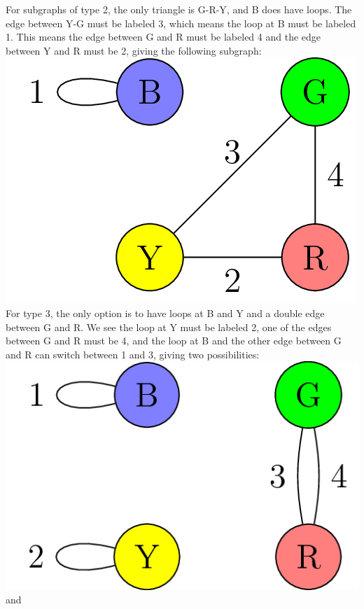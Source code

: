 \documentclass[10pt,]{book}
\theoremstyle{plain}
\theoremstyle{definition}
\theoremstyle{definition}
\theoremstyle{definition}
\begin{document}
%
\par
\hypertarget{p-66}{}%
For subgraphs of type 2, the only triangle is G-R-Y, and B does have loops. The edge between Y-G must be labeled 3, which means the loop at B must be labeled 1. This means the edge between G and R must be labeled 4 and the edge between Y and R must be 2, giving the following subgraph:%
\includegraphics[width=1\linewidth]{images/InstantInsanityImpossibleFirst.png}
\hypertarget{p-67}{}%
For type 3, the only option is to have loops at B and Y and a double edge between G and R. We see the loop at Y must be labeled 2, one of the edges between G and R must be 4, and the loop at B and the other edge between G and R can switch between 1 and 3, giving two possibilities:%
\includegraphics[width=1\linewidth]{images/InstantInsanityImpossibleSecond.png}
\hypertarget{p-68}{}%
and%
\end{document}
